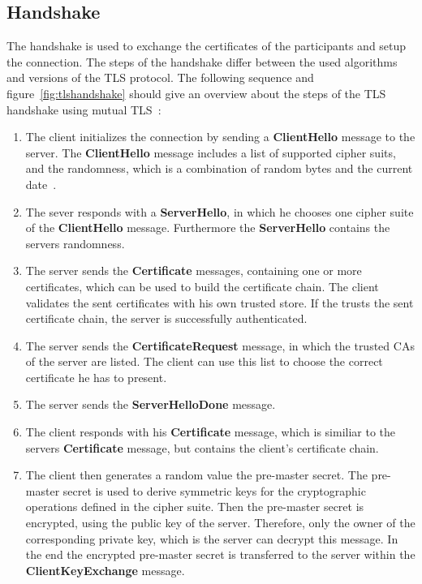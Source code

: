 \subsection{Handshake}
\label{sec:tlshandshake_details}
The handshake is used to exchange the certificates of the participants and setup the connection.
The steps of the handshake differ between the used algorithms and versions of the TLS protocol.
The following sequence and figure~\ref{fig:tlshandshake} should give an overview about the steps of the TLS handshake using mutual TLS~\cite{parsovs2013practical}:
\begin{enumerate}
	\item The client initializes the connection by sending a \textbf{ClientHello} message to the server.
		The \textbf{ClientHello} message includes a list of supported cipher suits, and the randomness, which is a combination of random bytes and the current date~\cite{mediumtls}.
	\item The sever responds with a \textbf{ServerHello}, in which he chooses one cipher suite of the \textbf{ClientHello} message.
		Furthermore the \textbf{ServerHello} contains the servers randomness.
	\item The server sends the \textbf{Certificate} messages, containing one or more certificates, which can be used to build the certificate chain.
		The client validates the sent certificates with his own trusted store.
		If the trusts the sent certificate chain, the server is successfully authenticated.
	\item The server sends the \textbf{CertificateRequest} message, in which the trusted CAs of the server are listed.
		The client can use this list to choose the correct certificate he has to present.
	\item The server sends the \textbf{ServerHelloDone} message.
	\item The client responds with his \textbf{Certificate} message, which is similiar to the servers \textbf{Certificate} message, but contains the client's certificate chain.
	\item The client then generates a random value the pre-master secret.
		The pre-master secret is used to derive symmetric keys for the cryptographic operations defined in the cipher suite.
		Then the pre-master secret is encrypted, using the public key of the server.
		Therefore, only the owner of the corresponding private key, which is the server can decrypt this message.
		In the end the encrypted pre-master secret is transferred to the server within the \textbf{ClientKeyExchange} message.

\end{enumerate}
